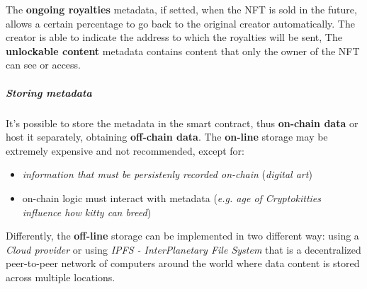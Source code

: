 \documentclass[10pt,a4paper]{report}
\begin{document}
The \textbf{ongoing royalties} metadata, if setted, when the NFT is sold in the future, allows a certain percentage to go back to the original creator automatically. The creator is able to indicate the address to which the royalties will be sent,
The \textbf{unlockable content} metadata contains content that only the owner of the NFT can see or access.
\subparagraph{Storing metadata}\label{sec:storing-metadata}
It's possible to store the metadata in the smart contract, thus \textbf{on-chain data} or host it separately, obtaining \textbf{off-chain data}.
The \textbf{on-line} storage may be extremely expensive and not recommended, except for:
\begin{itemize}
	\item 
	\textit{information that must be persistenly recorded on-chain} (\textit{digital art})
	\item 
	on-chain logic must interact with metadata (\textit{e.g. age of Cryptokitties influence how kitty can breed})

\end{itemize}
	Differently, the \textbf{off-line} storage can be implemented in two different way: using a \textit{Cloud provider} or using \textit{IPFS -  InterPlanetary File System} that is a decentralized peer-to-peer network of computers around the world where data content is stored across multiple locations.
\end{document}
